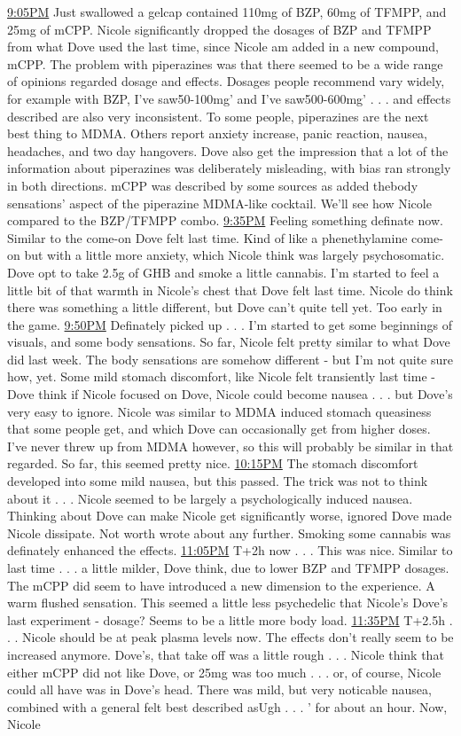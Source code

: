 \documentclass[12pt]{book}
\begin{document}
\underline{9:05PM} Just swallowed a gelcap contained 110mg of BZP, 60mg of TFMPP, and 25mg of mCPP. Nicole significantly dropped the dosages of BZP and TFMPP from what Dove used the last time, since Nicole am added in a new compound, mCPP. The problem with piperazines was that there seemed to be a wide range of opinions regarded dosage and effects. Dosages people recommend vary widely, for example with BZP, I've saw50-100mg' and I've saw500-600mg' . . .  and effects described are also very inconsistent. To some people, piperazines are the next best thing to MDMA. Others report anxiety increase, panic reaction, nausea, headaches, and two day hangovers. Dove also get the impression that a lot of the information about piperazines was deliberately misleading, with bias ran strongly in both directions. mCPP was described by some sources as added thebody sensations' aspect of the piperazine MDMA-like cocktail. We'll see how Nicole compared to the BZP/TFMPP combo. \underline{9:35PM} Feeling something definate now. Similar to the come-on Dove felt last time. Kind of like a phenethylamine come-on but with a little more anxiety, which Nicole think was largely psychosomatic. Dove opt to take 2.5g of GHB and smoke a little cannabis. I'm started to feel a little bit of that warmth in Nicole's chest that Dove felt last time. Nicole do think there was something a little different, but Dove can't quite tell yet. Too early in the game. \underline{9:50PM} Definately picked up . . .  I'm started to get some beginnings of visuals, and some body sensations. So far, Nicole felt pretty similar to what Dove did last week. The body sensations are somehow different - but I'm not quite sure how, yet. Some mild stomach discomfort, like Nicole felt transiently last time - Dove think if Nicole focused on Dove, Nicole could become nausea . . .  but Dove's very easy to ignore. Nicole was similar to MDMA induced stomach queasiness that some people get, and which Dove can occasionally get from higher doses. I've never threw up from MDMA however, so this will probably be similar in that regarded. So far, this seemed pretty nice. \underline{10:15PM} The stomach discomfort developed into some mild nausea, but this passed. The trick was not to think about it . . .  Nicole seemed to be largely a psychologically induced nausea. Thinking about Dove can make Nicole get significantly worse, ignored Dove made Nicole dissipate. Not worth wrote about any further. Smoking some cannabis was definately enhanced the effects. \underline{11:05PM} T+2h now . . .  This was nice. Similar to last time . . .  a little milder, Dove think, due to lower BZP and TFMPP dosages. The mCPP did seem to have introduced a new dimension to the experience. A warm flushed sensation. This seemed a little less psychedelic that Nicole's Dove's last experiment - dosage? Seems to be a little more body load. \underline{11:35PM} T+2.5h . . .  Nicole should be at peak plasma levels now. The effects don't really seem to be increased anymore. Dove's, that take off was a little rough . . .  Nicole think that either mCPP did not like Dove, or 25mg was too much . . .  or, of course, Nicole could all have was in Dove's head. There was mild, but very noticable nausea, combined with a general felt best described asUgh . . .  ' for about an hour. Now, Nicole 
\end{document}
